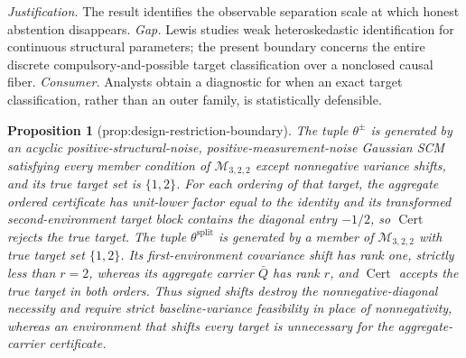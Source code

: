 \documentclass{article}
\newtheorem{proposition}{Proposition}
\begin{document}
\par\smallskip\noindent \textit{Justification.} The result identifies the observable separation scale at which honest abstention disappears. \textit{Gap.} Lewis studies weak heteroskedastic identification for continuous structural parameters; the present boundary concerns the entire discrete compulsory-and-possible target classification over a nonclosed causal fiber. \textit{Consumer.} Analysts obtain a diagnostic for when an exact target classification, rather than an outer family, is statistically defensible.

\begin{proposition}[prop:design-restriction-boundary]\label{prop:design-restriction-boundary}
The tuple \(\theta^{\pm}\) is generated by an acyclic positive-structural-noise, positive-measurement-noise Gaussian SCM satisfying every member condition of \(\mathcal M_{3,2,2}\) except nonnegative variance shifts, and its true target set is \(\{1,2\}\).  For each ordering of that target, the aggregate ordered certificate has unit-lower factor equal to the identity and its transformed second-environment target block contains the diagonal entry \(-1/2\), so \(\operatorname{Cert}\) rejects the true target.  The tuple \(\theta^{\mathrm{split}}\) is generated by a member of \(\mathcal M_{3,2,2}\) with true target set \(\{1,2\}\).  Its first-environment covariance shift has rank one, strictly less than \(r=2\), whereas its aggregate carrier \(\bar Q\) has rank \(r\), and \(\operatorname{Cert}\) accepts the true target in both orders.  Thus signed shifts destroy the nonnegative-diagonal necessity and require strict baseline-variance feasibility in place of nonnegativity, whereas an environment that shifts every target is unnecessary for the aggregate-carrier certificate.
\end{proposition}
\end{document}
